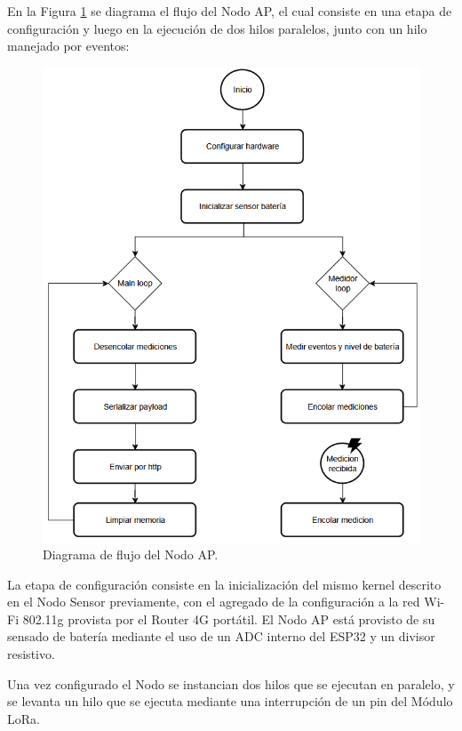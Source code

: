 En la Figura \ref{fig:diagrama-flujo-ap} se diagrama el flujo del Nodo AP, el cual consiste en una etapa de configuración y luego en la ejecución de dos hilos paralelos, junto con un hilo manejado por eventos:

\begin{figure}[H]
    \centering
    \includegraphics[width=1\linewidth]{Figures/Firmware/flujo_ap.png}
    \caption{Diagrama de flujo del Nodo AP.}
    \label{fig:diagrama-flujo-ap}
\end{figure}

La etapa de configuración consiste en la inicialización del mismo kernel descrito en el Nodo Sensor previamente, con el agregado de la configuración a la red Wi-Fi 802.11g provista por el Router 4G portátil.
El Nodo AP está provisto de su sensado de batería mediante el uso de un ADC interno del ESP32 y un divisor resistivo.

Una vez configurado el Nodo se instancian dos hilos que se ejecutan en paralelo, y se levanta un hilo que se ejecuta mediante una interrupción de un pin del Módulo LoRa.

